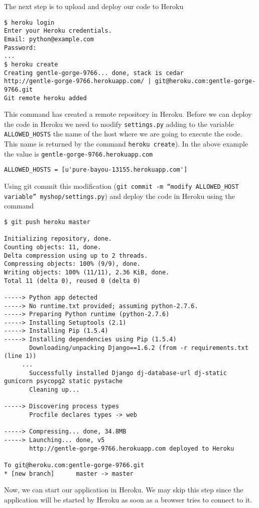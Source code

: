 \documentclass[12pt]{article} %
\begin{document}
The next step is to upload and deploy our code to Heroku

 \begin{verbatim}
$ heroku login
Enter your Heroku credentials.
Email: python@example.com
Password:
...
$ heroku create 
Creating gentle-gorge-9766... done, stack is cedar 
http://gentle-gorge-9766.herokuapp.com/ | git@heroku.com:gentle-gorge-9766.git 
Git remote heroku added
 \end{verbatim}

 
 This command has created a remote repository in Heroku. Before we can deploy the code in Heroku  we need to modify  \texttt{settings.py} adding to the variable \texttt{ALLOWED\_HOSTS} the name of the host where we are going to execute the code. This name is returned by the command \texttt{heroku create}). In the above example the value is  \texttt{gentle-gorge-9766.herokuapp.com}

\begin{verbatim}
ALLOWED_HOSTS = [u'pure-bayou-13155.herokuapp.com']
\end{verbatim}
Using git commit this modification  (\texttt{git commit -m ``modify ALLOWED\_HOST variable'' myshop/settings.py}) and deploy the code in Heroku using the command

\begin{verbatim}
$ git push heroku master
 
Initializing repository, done. 
Counting objects: 11, done. 
Delta compression using up to 2 threads. 
Compressing objects: 100% (9/9), done. 
Writing objects: 100% (11/11), 2.36 KiB, done. 
Total 11 (delta 0), reused 0 (delta 0) 
 
-----> Python app detected 
-----> No runtime.txt provided; assuming python-2.7.6. 
-----> Preparing Python runtime (python-2.7.6) 
-----> Installing Setuptools (2.1) 
-----> Installing Pip (1.5.4) 
-----> Installing dependencies using Pip (1.5.4) 
       Downloading/unpacking Django==1.6.2 (from -r requirements.txt (line 1)) 
     ...
       Successfully installed Django dj-database-url dj-static gunicorn psycopg2 static pystache 
       Cleaning up... 
 
-----> Discovering process types 
       Procfile declares types -> web 
 
-----> Compressing... done, 34.8MB 
-----> Launching... done, v5 
       http://gentle-gorge-9766.herokuapp.com deployed to Heroku 
 
To git@heroku.com:gentle-gorge-9766.git 
* [new branch]      master -> master 
 \end{verbatim}
Now, we can start our application in Heroku. We may skip this step since the application will be started by Heroku as soon as  a browser tries to connect to it.
\end{document}
